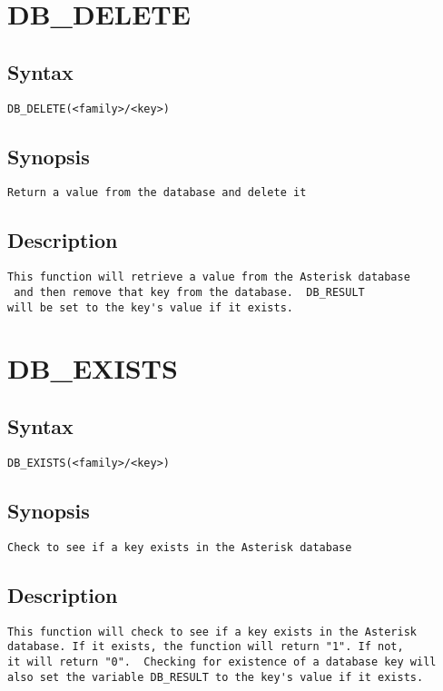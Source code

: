 \section{DB\_DELETE}
\subsection{Syntax}
\begin{verbatim}
DB_DELETE(<family>/<key>)
\end{verbatim}
\subsection{Synopsis}
\begin{verbatim}
Return a value from the database and delete it
\end{verbatim}
\subsection{Description}
\begin{verbatim}
This function will retrieve a value from the Asterisk database
 and then remove that key from the database.  DB_RESULT
will be set to the key's value if it exists.

\end{verbatim}


\section{DB\_EXISTS}
\subsection{Syntax}
\begin{verbatim}
DB_EXISTS(<family>/<key>)
\end{verbatim}
\subsection{Synopsis}
\begin{verbatim}
Check to see if a key exists in the Asterisk database
\end{verbatim}
\subsection{Description}
\begin{verbatim}
This function will check to see if a key exists in the Asterisk
database. If it exists, the function will return "1". If not,
it will return "0".  Checking for existence of a database key will
also set the variable DB_RESULT to the key's value if it exists.

\end{verbatim}


